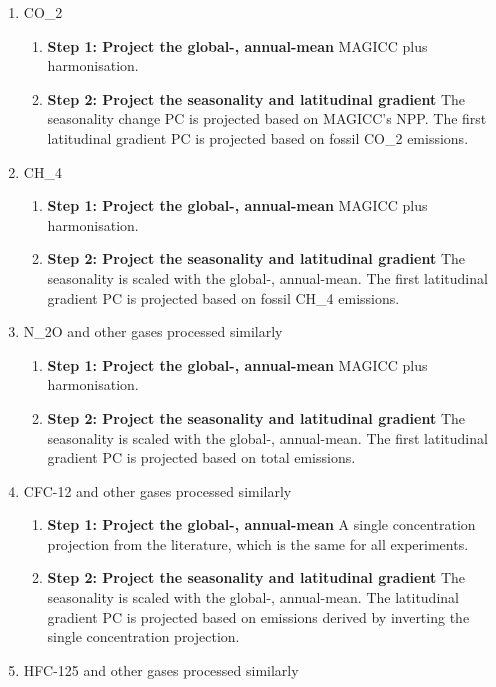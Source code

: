 \begin{enumerate}
    \item {
        CO_2

        \begin{enumerate}
            \item {
                \textbf{Step 1: Project the global-, annual-mean}
                MAGICC plus harmonisation.
            }
            \item {
                \textbf{Step 2: Project the seasonality and latitudinal gradient}
                The seasonality change PC is projected based on MAGICC's NPP.
                The first latitudinal gradient PC is projected based on fossil CO_2 emissions.
            }
        \end{enumerate}
    }
    \item {
        CH_4

        \begin{enumerate}
            \item {
                \textbf{Step 1: Project the global-, annual-mean}
                MAGICC plus harmonisation.
            }
            \item {
                \textbf{Step 2: Project the seasonality and latitudinal gradient}
                The seasonality is scaled with the global-, annual-mean.
                The first latitudinal gradient PC is projected based on fossil CH_4 emissions.
            }
        \end{enumerate}
    }
    \item {
        N_2O and other gases processed similarly

        \begin{enumerate}
            \item {
                \textbf{Step 1: Project the global-, annual-mean}
                MAGICC plus harmonisation.
            }
            \item {
                \textbf{Step 2: Project the seasonality and latitudinal gradient}
                The seasonality is scaled with the global-, annual-mean.
                The first latitudinal gradient PC is projected based on total emissions.
            }
        \end{enumerate}
    }
    \item {
        CFC-12 and other gases processed similarly

        \begin{enumerate}
            \item {
                \textbf{Step 1: Project the global-, annual-mean}
                A single concentration projection from the literature, which is the same for all experiments.
            }
            \item {
                \textbf{Step 2: Project the seasonality and latitudinal gradient}
                The seasonality is scaled with the global-, annual-mean.
                The latitudinal gradient PC is projected based on emissions derived by inverting the single concentration projection.
            }
        \end{enumerate}
    }
    \item {
        HFC-125 and other gases processed similarly

}
\end{enumerate}
